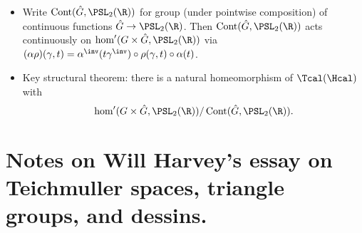 \documentclass[11pt]{amsart}
\begin{document}
\begin{itemize}
		\item Write $\Cont(\hat{G}, \PSL_2(\R))$ for group (under pointwise composition) of continuous functions $\hat{G} \to \PSL_2(\R)$. Then $\Cont(\hat{G}, \PSL_2(\R))$ acts continuously on $\hom'(G\times \hat{G}, \PSL_2(\R))$ via $(\alpha \rho ) (\gamma,t)= \alpha^\inv (t\gamma^\inv ) \circ \rho(\gamma,t) \circ \alpha(t)$. 
		\item Key structural theorem: there is a natural homeomorphism of $\Tcal(\Hcal)$ with 
			\begin{equation*}
			  \hom'(G\times \hat{G}, \PSL_2(\R))/\Cont(\hat{G}, \PSL_2(\R)).
			\end{equation*}
		\end{itemize}

\section{Notes on Will Harvey's essay on Teichmuller spaces, triangle groups, and dessins.}
\end{document}
